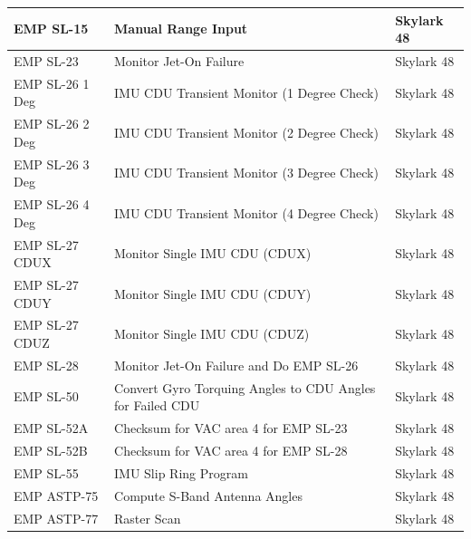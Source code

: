 \documentclass[11pt]{article} %
\begin{document}
\begin{tabular}{|l|L{9cm}|l|}
\hline
EMP SL-15&Manual Range Input&Skylark 48\\
\hline
EMP SL-23&Monitor Jet-On Failure&Skylark 48\\
\hline
EMP SL-26 1 Deg&IMU CDU Transient Monitor (1 Degree Check)&Skylark 48\\
\hline
EMP SL-26 2 Deg&IMU CDU Transient Monitor (2 Degree Check)&Skylark 48\\
\hline
EMP SL-26 3 Deg&IMU CDU Transient Monitor (3 Degree Check)&Skylark 48\\
\hline
EMP SL-26 4 Deg&IMU CDU Transient Monitor (4 Degree Check)&Skylark 48\\
\hline
EMP SL-27 CDUX&Monitor Single IMU CDU (CDUX)&Skylark 48\\
\hline
EMP SL-27 CDUY&Monitor Single IMU CDU (CDUY)&Skylark 48\\
\hline
EMP SL-27 CDUZ&Monitor Single IMU CDU (CDUZ)&Skylark 48\\
\hline
EMP SL-28&Monitor Jet-On Failure and Do EMP SL-26&Skylark 48\\
\hline
EMP SL-50&Convert Gyro Torquing Angles to CDU Angles for Failed CDU&Skylark 48\\
\hline
EMP SL-52A&Checksum for VAC area 4 for EMP SL-23&Skylark 48\\
\hline
EMP SL-52B&Checksum for VAC area 4 for EMP SL-28&Skylark 48\\
\hline
EMP SL-55&IMU Slip Ring Program&Skylark 48\\
\hline
EMP ASTP-75&Compute S-Band Antenna Angles&Skylark 48\\
\hline
EMP ASTP-77&Raster Scan&Skylark 48\\
\hline
\end{tabular}
\end{document}
